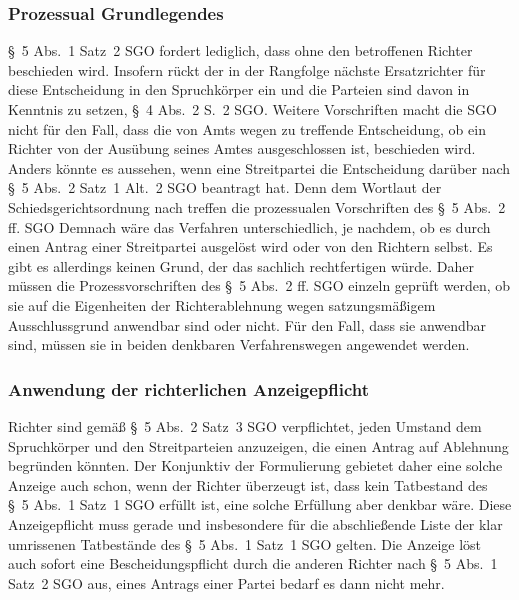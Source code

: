 \subsubsection{Prozessual Grundlegendes}
\label{Zusammensetzung:Spruchkoerper:Befangenheitsvermutung:Prozessuales}
\S~5 Abs.~1 Satz~2 SGO fordert lediglich, dass ohne den betroffenen Richter beschieden wird.
Insofern rückt der in der Rangfolge nächste Ersatzrichter für diese Entscheidung in den Spruchkörper ein und die Parteien sind davon in Kenntnis zu setzen, \S~4 Abs.~2 S.~2 SGO.
Weitere Vorschriften macht die SGO nicht für den Fall, dass die von Amts wegen zu treffende Entscheidung, ob ein Richter von der Ausübung seines Amtes ausgeschlossen ist, beschieden wird.
Anders könnte es aussehen, wenn eine Streitpartei die Entscheidung darüber nach \S~5 Abs.~2 Satz~1 Alt.~2 SGO beantragt hat.
Denn dem Wortlaut der Schiedsgerichtsordnung nach treffen die prozessualen Vorschriften des \S~5 Abs.~2 ff. SGO
Demnach wäre das Verfahren unterschiedlich, je nachdem, ob es durch einen Antrag einer Streitpartei ausgelöst wird oder von den Richtern selbst.
Es gibt es allerdings keinen Grund, der das sachlich rechtfertigen würde.
Daher müssen die Prozessvorschriften des \S~5 Abs.~2 ff. SGO einzeln geprüft werden, ob sie auf die Eigenheiten der Richterablehnung wegen satzungsmäßigem Ausschlussgrund anwendbar sind oder nicht.
Für den Fall, dass sie anwendbar sind, müssen sie in beiden denkbaren Verfahrenswegen angewendet werden.

\subsubsection{Anwendung der richterlichen Anzeigepflicht}
\label{Zusammensetzung:Spruchkoerper:Befangenheitsvermutung:Anzeigepflicht}
Richter sind gemäß \S~5 Abs.~2 Satz~3 SGO verpflichtet, jeden Umstand dem Spruchkörper und den Streitparteien anzuzeigen, die einen Antrag auf Ablehnung begründen könnten.
Der Konjunktiv der Formulierung gebietet daher eine solche Anzeige auch schon, wenn der Richter überzeugt ist, dass kein Tatbestand des \S~5 Abs.~1 Satz~1 SGO erfüllt ist, eine solche Erfüllung aber denkbar wäre.
Diese Anzeigepflicht muss gerade und insbesondere für die abschließende Liste der klar umrissenen Tatbestände des \S~5 Abs.~1 Satz~1 SGO gelten.
Die Anzeige löst auch sofort eine Bescheidungspflicht durch die anderen Richter nach \S~5 Abs.~1 Satz~2 SGO aus, eines Antrags einer Partei bedarf es dann nicht mehr.

